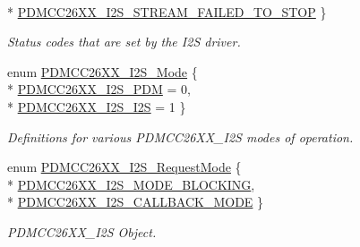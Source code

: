 \begin{DoxyCompactItemize}
\\*
\hyperlink{_p_d_m_c_c26_x_x__util_8h_ac1e4fbeb33409a874015d4e0609ddff1a895fc1d5ca5ab81c4c7c7223c0b8b6a5}{P\+D\+M\+C\+C26\+X\+X\+\_\+\+I2\+S\+\_\+\+S\+T\+R\+E\+A\+M\+\_\+\+F\+A\+I\+L\+E\+D\+\_\+\+T\+O\+\_\+\+S\+T\+O\+P}
 \}
\begin{DoxyCompactList}\small\item\em Status codes that are set by the I2\+S driver. \end{DoxyCompactList}\item 
enum \hyperlink{_p_d_m_c_c26_x_x__util_8h_a7392b654a84f42e717a4df1485058a84}{P\+D\+M\+C\+C26\+X\+X\+\_\+\+I2\+S\+\_\+\+Mode} \{ \\*
\hyperlink{_p_d_m_c_c26_x_x__util_8h_a7392b654a84f42e717a4df1485058a84a2e5f04919021778dc64b531cc9ca19dd}{P\+D\+M\+C\+C26\+X\+X\+\_\+\+I2\+S\+\_\+\+P\+D\+M} = 0, 
\\*
\hyperlink{_p_d_m_c_c26_x_x__util_8h_a7392b654a84f42e717a4df1485058a84ae4abdf809e7f1f26a1cbdee9cdfbec2e}{P\+D\+M\+C\+C26\+X\+X\+\_\+\+I2\+S\+\_\+\+I2\+S} = 1
 \}
\begin{DoxyCompactList}\small\item\em Definitions for various P\+D\+M\+C\+C26\+X\+X\+\_\+\+I2\+S modes of operation. \end{DoxyCompactList}\item 
enum \hyperlink{_p_d_m_c_c26_x_x__util_8h_aef896b2a7fc07d3b145f8d02eaa9e377}{P\+D\+M\+C\+C26\+X\+X\+\_\+\+I2\+S\+\_\+\+Request\+Mode} \{ \\*
\hyperlink{_p_d_m_c_c26_x_x__util_8h_aef896b2a7fc07d3b145f8d02eaa9e377a8a325f16e9c7ea73e9a6571285bf4de6}{P\+D\+M\+C\+C26\+X\+X\+\_\+\+I2\+S\+\_\+\+M\+O\+D\+E\+\_\+\+B\+L\+O\+C\+K\+I\+N\+G}, 
\\*
\hyperlink{_p_d_m_c_c26_x_x__util_8h_aef896b2a7fc07d3b145f8d02eaa9e377a8b043983d80de30bc3c61f1df84a2212}{P\+D\+M\+C\+C26\+X\+X\+\_\+\+I2\+S\+\_\+\+C\+A\+L\+L\+B\+A\+C\+K\+\_\+\+M\+O\+D\+E}
 \}
\begin{DoxyCompactList}\small\item\em P\+D\+M\+C\+C26\+X\+X\+\_\+\+I2\+S Object. \end{DoxyCompactList}\end{DoxyCompactItemize}
